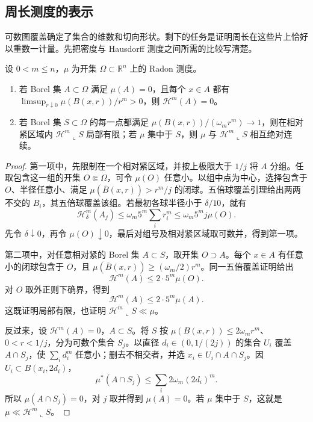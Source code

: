 \subsection{周长测度的表示}
\label{g3:subsec:2104:06}
可数图覆盖确定了集合的维数和切向形状。剩下的任务是证明周长在这些片上恰好以重数一计量。先把密度与 Hausdorff 测度之间所需的比较写清楚。

\begin{lemma}\label{g3:lem:hausdorff-density-comparison}
	设 \(0<m\le n\)，\(\mu\) 为开集 \(\Omega\subset\mathbb R^n\) 上的 Radon 测度。
	\begin{enumerate}
		\item 若 Borel 集 \(A\subset\Omega\) 满足 \(\mu(A)=0\)，且每个 \(x\in A\) 都有
		\(\limsup_{r\downarrow0}\mu(B(x,r))/r^m>0\)，则 \(\mathcal H^m(A)=0\)。
		\item 若 Borel 集 \(S\subset\Omega\) 的每一点都满足
		\(\mu(B(x,r))/(\omega_mr^m)\to1\)，则在相对紧区域内
		\(\mathcal H^m\llcorner S\) 局部有限；若 \(\mu\) 集中于 \(S\)，则 \(\mu\) 与 \(\mathcal H^m\llcorner S\) 相互绝对连续。
	\end{enumerate}
\end{lemma}
\begin{proof}
	第一项中，先限制在一个相对紧区域，并按上极限大于 \(1/j\) 将 \(A\) 分组。任取包含这一组的开集 \(O\Subset\Omega\)，可令 \(\mu(O)\) 任意小。以组中点为中心，选择包含于 \(O\)、半径任意小、满足 \(\mu(\overline B(x,r))>r^m/j\) 的闭球。五倍球覆盖引理给出两两不交的 \(B_i\)，其五倍球覆盖该组。若最初各球半径小于 \(\delta/10\)，就有
	\[
		\mathcal H^m_\delta(A_j)
		\le\omega_m5^m\sum_i r_i^m
		\le\omega_m5^m j\mu(O).
	\]
	先令 \(\delta\downarrow0\)，再令 \(\mu(O)\downarrow0\)，最后对组号及相对紧区域取可数并，得到第一项。

	第二项中，对任意相对紧的 Borel 集 \(A\subset S\)，取开集 \(O\supset A\)。每个 \(x\in A\) 有任意小的闭球包含于 \(O\)，且
	\(\mu(\overline B(x,r))\ge(\omega_m/2)r^m\)。同一五倍覆盖证明给出
	\[
		\mathcal H^m(A)\le2\cdot5^m\mu(O).
	\]
	对 \(O\) 取外正则下确界，得到
	\begin{equation}\label{g3:eq:hausdorff-controlled-by-perimeter}
		\mathcal H^m(A)\le2\cdot5^m\mu(A).
	\end{equation}
	这既证明局部有限，也证明 \(\mathcal H^m\llcorner S\ll\mu\)。

	反过来，设 \(\mathcal H^m(A)=0\)，\(A\subset S\)。将 \(S\) 按
	\(\mu(B(x,r))\le2\omega_mr^m\)、\(0<r<1/j\)，分为可数个集合 \(S_j\)。以直径 \(d_i\in(0,1/(2j))\) 的集合 \(U_i\) 覆盖 \(A\cap S_j\)，使 \(\sum_i d_i^m\) 任意小；删去不相交者，并选 \(x_i\in U_i\cap A\cap S_j\)。因 \(U_i\subset B(x_i,2d_i)\)，
	\[
		\mu^*(A\cap S_j)\le\sum_i2\omega_m(2d_i)^m.
	\]
	所以 \(\mu(A\cap S_j)=0\)，对 \(j\) 取并得到 \(\mu(A)=0\)。若 \(\mu\) 集中于 \(S\)，这就是 \(\mu\ll\mathcal H^m\llcorner S\)。
\end{proof}


